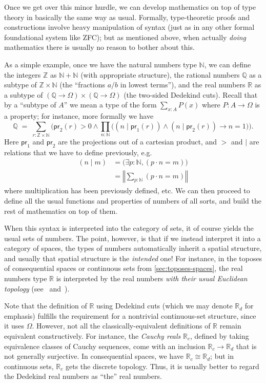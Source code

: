 \documentclass[10pt]{article}
\def\N{\mathbb{N}}
\def\Z{\mathbb{Z}}
\def\Q{\mathbb{Q}}
\def\R{\mathbb{R}}
\def\proj#1{\mathsf{pr}_{#1}}
\numberwithin{equation}{section}
\newcommand{\trunc}[2]{\mathopen{}\left\Vert #2\right\Vert_{#1}\mathclose{}}
\newcommand{\brck}[1]{\trunc{}{#1}}
\begin{document}
Once we get over this minor hurdle, we can develop mathematics on top of type theory in basically the same way as usual.
Formally, type-theoretic proofs and constructions involve heavy manipulation of syntax (just as in any other formal foundational system like ZFC); but as mentioned above, when actually \emph{doing} mathematics there is usually no reason to bother about this.

As a simple example, once we have the natural numbers type $\N$, we can define the integers $\Z$ as $\N+\N$ (with appropriate structure), the rational numbers $\Q$ as a subtype of $\Z\times \N$ (the ``fractions $a/b$ in lowest terms''), and the real numbers $\R$ as a subtype of $(\Q\to\Omega)\times (\Q\to\Omega)$ (the two-sided Dedekind cuts).
Recall that by a ``subtype of $A$'' we mean a type of the form $\sum_{x:A} P(x)$ where $P:A\to\Omega$ is a property; for instance, more formally we have
\[ \Q \;=\; \textstyle\sum_{r:\Z\times \N} \Big(\proj2(r)>0 \land \prod_{n:\N} \big((n\mid \proj1(r)) \land (n\mid\proj2(r)) \to n=1\big)\Big). \]
Here $\proj1$ and $\proj2$ are the projections out of a cartesian product, and $>$ and $\mid$ are relations that we have to define previously, e.g.
\begin{align*}
  (n\mid m) &=  \big(\exists p:\N, (p \cdot n = m)\big) \\
  &= \brck{\textstyle\sum_{p:\N} (p \cdot n = m)}
\end{align*}
where multiplication has been previously defined, etc.
We can then proceed to define all the usual functions and properties of numbers of all sorts, and build the rest of mathematics on top of them.

When this syntax is interpreted into the category of sets, it of course yields the usual sets of numbers.
The point, however, is that if we instead interpret it into a category of spaces, the types of numbers automatically inherit a spatial structure, and usually that spatial structure is the \emph{intended} one!
For instance, in the toposes of consequential spaces or continuous sets from \cref{sec:toposes-spaces}, the real numbers type $\R$ is interpreted by the real numbers \emph{with their usual Euclidean topology} (see~\cite[Proposition 4.4]{ptj:topological-topos} and~\cite[Theorem VI.9.2]{mm:shv-gl}).

Note that the definition of $\R$ using Dedekind cuts (which we may denote $\R_d$ for emphasis) fulfills the requirement for a nontrivial continuous-set structure, since it uses $\Omega$.
However, not all the classically-equivalent definitions of $\R$ remain equivalent constructively.
For instance, the \emph{Cauchy reals} $\R_c$, defined by taking equivalence classes of Cauchy sequences, come with an inclusion $\R_c \to \R_d$ that is not generally surjective.
In consequential spaces, we have $\R_c \cong \R_d$; but in continuous sets, $\R_c$ gets the discrete topology.
Thus, it is usually better to regard the Dedekind real numbers as ``the'' real numbers. %
\end{document}
